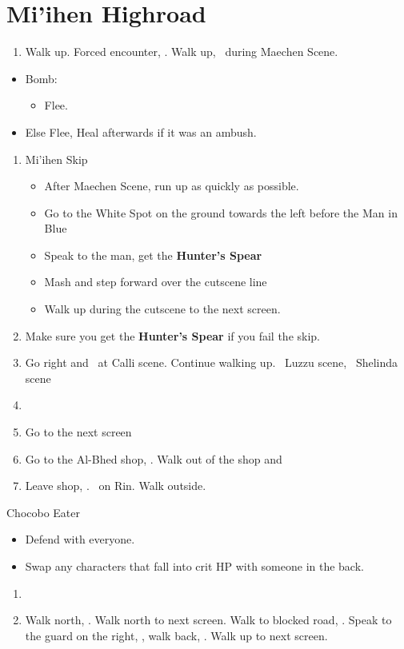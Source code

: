 \chapter{Mi'ihen Highroad}

\begin{enumerate}
	\item Walk up. Forced encounter, \sd. Walk up, \sd\ during Maechen Scene.
\end{enumerate}
\begin{encounters}
	\begin{itemize}
		\item Bomb:
		\begin{itemize}
			\kimahrif Lancet Bomb, learn \textbf{Self Destruct}
			\item Flee.
		\end{itemize}
		\item Else Flee,  Heal afterwards if it was an ambush.
	\end{itemize}
\end{encounters}
\begin{enumerate}[resume]
	\item {Mi'ihen Skip}
	\begin{itemize}
		\item After Maechen Scene, run up as quickly as possible.
		\item Go to the White Spot on the ground towards the left before the Man in Blue
		\item Speak to the man, get the \textbf{Hunter's Spear}
		\item Mash and step forward over the cutscene line
		\item Walk up during the cutscene to the next screen.
	\end{itemize}
	\item Make sure you get the \textbf{Hunter's Spear} if you fail the skip.
	\item Go right and \sd\ at Calli scene. Continue walking up. \sd\ Luzzu scene, \sd\ Shelinda scene
	\item \formation{\tidus}{\wakka}{\kimahri}
	\item Go to the next screen
	\item Go to the Al-Bhed shop, \sd. Walk out of the shop and \cs[5:30]
	\item Leave shop, \sd. \sd\ on Rin. Walk outside.
\end{enumerate}
\begin{battle}{Chocobo Eater}
	\begin{itemize}
		\tidusf Haste Boss
		\item Defend with everyone.
		\item Swap any characters that fall into crit HP with someone in the back.
	\end{itemize}
\end{battle}
\begin{enumerate}[resume]
	\item \sd
	\item Walk north, \save. Walk north to next screen. Walk to blocked road, \sd. Speak to the guard on the right, \sd, walk back, \sd. Walk up to next screen.
\end{enumerate}